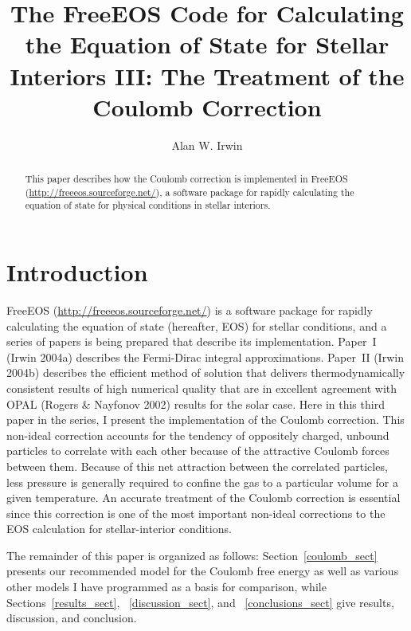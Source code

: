 


\title{The FreeEOS Code for Calculating the Equation of State for Stellar
Interiors III: The Treatment of the Coulomb Correction}

\author{Alan W. Irwin}

\begin{abstract}
This paper describes how the Coulomb correction
is implemented in FreeEOS (\url{http://freeeos.sourceforge.net/}), a
software package for rapidly calculating the equation of state for physical
conditions in stellar interiors.
\end{abstract}

\section{Introduction}

FreeEOS (\url{http://freeeos.sourceforge.net/}) is a software package for
rapidly calculating the equation of state (hereafter, EOS) for stellar
conditions, and a series of papers is being prepared that describe its
implementation. Paper~I (Irwin 2004a) describes the Fermi-Dirac integral
approximations. Paper~II (Irwin 2004b) describes the efficient method of
solution that delivers thermodynamically consistent results of high
numerical quality that are in excellent agreement with OPAL (Rogers \&
Nayfonov 2002) results for the solar case. Here in this third paper in the
series, I present the implementation of the Coulomb correction. This
non-ideal correction accounts for the tendency of oppositely charged,
unbound particles to correlate with each other because of the attractive
Coulomb forces between them. Because of this net attraction between the
correlated particles, less pressure is generally required to confine the gas
to a particular volume for a given temperature. An accurate treatment of the
Coulomb correction is essential since this correction is one of the most
important non-ideal corrections to the EOS calculation for stellar-interior
conditions.

The remainder of this paper is organized as follows:
Section~\ref{coulomb_sect} presents our recommended model for the Coulomb
free energy as well as various other models I have programmed as a basis
for comparison, while Sections~\ref{results_sect}, ~\ref{discussion_sect},
and ~\ref{conclusions_sect} give results, discussion, and conclusion.

